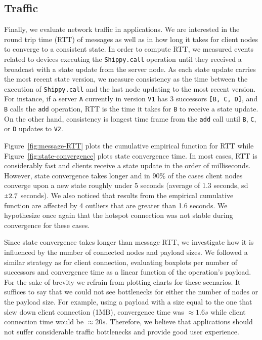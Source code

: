 \subsection{Traffic}
\label{sub:eval:traffic}


Finally, we evaluate network traffic in \APIshort applications.
We are interested in the round trip time (RTT) of messages as well as in how long it takes for client nodes to converge to a consistent state.
In order to compute RTT, we measured events related to devices executing the \texttt{Shippy.call} operation until they received a broadcast with a state update from the server node.
As each state update carries the most recent state version, we measure consistency as the time between the execution of \texttt{Shippy.call} and the last node updating to the most recent version.
For instance, if a server \texttt{A} currently in version \texttt{V1} has 3 successors \texttt{[B, C, D]}, and \texttt{B} calls the \texttt{add} operation, RTT is the time it takes for \texttt{B} to receive a state update.
On the other hand, consistency is longest time frame from the \texttt{add} call until \texttt{B}, \texttt{C}, or \texttt{D} updates to \texttt{V2}.


Figure~\ref{fig:message-RTT} plots the cumulative empirical function for RTT while Figure~\ref{fig:state-convergence} plots state convergence time.
In most cases, RTT is considerably fast and clients receive a state update in the order of milliseconds.
However, state convergence takes longer and in 90\% of the cases client nodes converge upon a new state roughly under 5 seconds (average of 1.3 seconds, sd $\rpm 2.7$ seconds).
We also noticed that results from the empirical cumulative function are affected by 4 outliers that are greater than 1.6 seconds. We hypothesize once again that the hotspot connection was not stable during convergence for these cases. 


Since state convergence takes longer than message RTT, we investigate how it is influenced by the number of connected nodes and payload sizes.
We followed a similar strategy as for client connection, evaluating boxplots per number of successors and convergence time as a linear function of the operation's payload.
For the sake of brevity we refrain from plotting charts for these scenarios.
It suffices to say that we could not see bottlenecks for either the number of nodes or the payload size. 
For example, using a payload with a size equal to the one that slew down client connection (1MB), convergence time was $\approx 1.6s$ while client connection time would be $\approx 20s$.
Therefore, we believe that \APIshort applications should not suffer considerable traffic bottlenecks and provide good user experience. 


